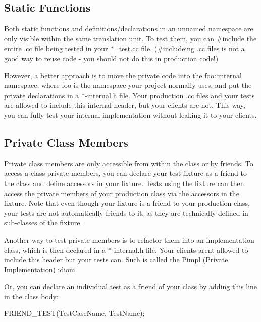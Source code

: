 \subsection*{Static Functions}

Both static functions and definitions/declarations in an unnamed namespace are only visible within the same translation unit. To test them, you can {\ttfamily \#include} the entire {\ttfamily .cc} file being tested in your {\ttfamily $\ast$\+\_\+test.cc} file. ({\ttfamily \#include}ing {\ttfamily .cc} files is not a good way to reuse code -\/ you should not do this in production code!)

However, a better approach is to move the private code into the {\ttfamily foo\+::internal} namespace, where {\ttfamily foo} is the namespace your project normally uses, and put the private declarations in a {\ttfamily $\ast$-\/internal.h} file. Your production {\ttfamily .cc} files and your tests are allowed to include this internal header, but your clients are not. This way, you can fully test your internal implementation without leaking it to your clients.

\subsection*{Private Class Members}

Private class members are only accessible from within the class or by friends. To access a class\textquotesingle{} private members, you can declare your test fixture as a friend to the class and define accessors in your fixture. Tests using the fixture can then access the private members of your production class via the accessors in the fixture. Note that even though your fixture is a friend to your production class, your tests are not automatically friends to it, as they are technically defined in sub-\/classes of the fixture.

Another way to test private members is to refactor them into an implementation class, which is then declared in a {\ttfamily $\ast$-\/internal.h} file. Your clients aren\textquotesingle{}t allowed to include this header but your tests can. Such is called the Pimpl (Private Implementation) idiom.

Or, you can declare an individual test as a friend of your class by adding this line in the class body\+:


\begin{DoxyCode}
FRIEND\_TEST(TestCaseName, TestName);
\end{DoxyCode}


